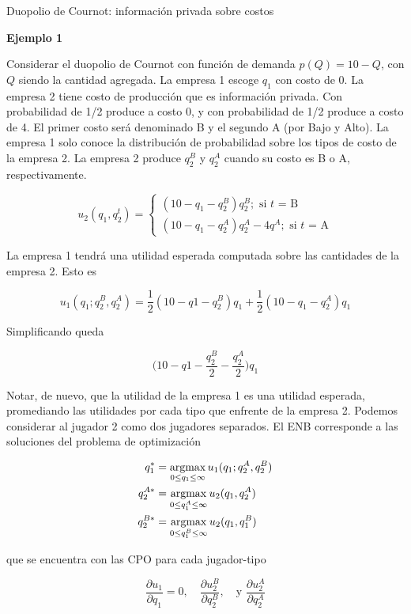 \documentclass[12pt]{article}
\begin{document}
\begin{exbox}{Duopolio de Cournot: información privada sobre costos}

	\textbf{Ejemplo 1}

	Considerar el duopolio de Cournot con función de demanda $ p(Q) = 10 - Q $, con $ Q $ siendo la cantidad agregada. La empresa 1 escoge $ q_1 $ con costo de 0. La empresa 2 tiene costo de producción que es información privada. Con probabilidad de 1/2 produce a costo 0, y con probabilidad de 1/2 produce a costo de 4. El primer costo será denominado B y el segundo A (por Bajo y Alto). La empresa 1 solo conoce la distribución de probabilidad sobre los tipos de costo de la empresa 2. La empresa 2 produce $ q_2^B $ y $ q_2^A $ cuando su costo es B o A, respectivamente.

	\[
		u_2(q_1, q_2^t) = \begin{cases}
			(10 - q_1 - q_2^B)q_2^B; \text{ si $t$ = B} \\
			(10 - q_1 - q_2^A)q_2^A - 4q^A; \text{ si $t$ = A}
		\end{cases}
	\]

	La empresa 1 tendrá una utilidad esperada computada sobre las cantidades de la empresa 2. Esto es

	$$ u_1(q_1;q_2^B, q_2^A ) = \frac{1}{2}(10 - q1 - q_2^B)q_1 + \frac{1}{2} (10 -q_1 - q_2^A)q_1$$

	Simplificando queda

	$$
		\Biggl(10-q1-\frac{q_2^B}{2} - \frac{q_2^A}{2} \Biggr)q_1
	$$

	Notar, de nuevo, que la utilidad de la empresa 1 es una utilidad esperada, promediando las utilidades por cada tipo que enfrente de la empresa 2. Podemos considerar al jugador 2 como dos jugadores separados. El ENB corresponde a las soluciones del problema de optimización

	\begin{align*}
		q_1^*    & = \operatorname*{argmax}_{0\leq q_1 \leq \infty} u_1(q_1; q_2^A, q_2^B) \\
		q_2^{A*} & = \operatorname*{argmax}_{0\leq q_1^A \leq \infty} u_2(q_1, q_2^A)      \\
		q_2^{B*} & = \operatorname*{argmax}_{0\leq q_1^B \leq \infty} u_2(q_1, q_1^B)
	\end{align*}

	que se encuentra con las CPO para cada jugador-tipo

	$$ \frac{\partial u_1}{\partial q_1}=0,\quad \frac{\partial u_2^B}{\partial q_2^B},\quad \text{y } \frac{\partial u_2^A}{\partial q_2^A} $$


\end{exbox}
\end{document}

